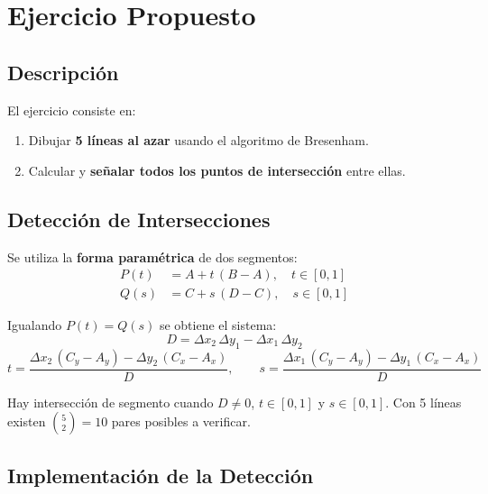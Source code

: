 \documentclass[12pt,a4paper]{article}
\begin{document}
\section{Ejercicio Propuesto}

\subsection{Descripción}

El ejercicio consiste en:
\begin{enumerate}
  \item Dibujar \textbf{5 líneas al azar} usando el algoritmo de Bresenham.
  \item Calcular y \textbf{señalar todos los puntos de intersección} entre ellas.
\end{enumerate}

\subsection{Detección de Intersecciones}

Se utiliza la \textbf{forma paramétrica} de dos segmentos:
\begin{align}
  P(t) &= A + t\,(B - A), \quad t \in [0,1]\\
  Q(s) &= C + s\,(D - C), \quad s \in [0,1]
\end{align}

Igualando $P(t) = Q(s)$ se obtiene el sistema:
\begin{equation}
  D = \Delta x_2\,\Delta y_1 - \Delta x_1\,\Delta y_2
\end{equation}
\begin{equation}
  t = \frac{\Delta x_2\,(C_y - A_y) - \Delta y_2\,(C_x - A_x)}{D}, \qquad
  s = \frac{\Delta x_1\,(C_y - A_y) - \Delta y_1\,(C_x - A_x)}{D}
\end{equation}

Hay intersección de segmento cuando $D \neq 0$, $t \in [0,1]$ y $s \in [0,1]$.
Con 5 líneas existen $\binom{5}{2} = 10$ pares posibles a verificar.

\subsection{Implementación de la Detección}
\end{document}
